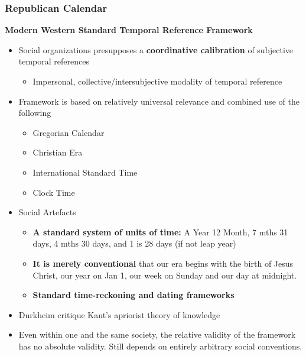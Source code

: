 \documentclass[a4paper]{article}
\begin{document}
\subsubsection{Republican Calendar}
\textbf{Modern Western Standard Temporal Reference Framework}
\begin{itemize}
	\item Social organizations presupposes a \textbf{coordinative calibration} of subjective temporal references 
	\begin{itemize}[label=$\circ$]
		\item Impersonal, collective/intersubjective modality of temporal reference
	\end{itemize}
	\item Framework is based on relatively universal relevance and combined use of the following
	\begin{itemize}[label=$\circ$]
		\item Gregorian Calendar
		\item Christian Era
		\item International Standard Time 
		\item Clock Time
	\end{itemize}
	\item Social Artefacts
	\begin{itemize}[label=$\circ$]
		\item \textbf{A standard system of units of time:} A Year 12 Month, 7 mths 31 days, 4 mths 30 days, and 1 is 28 days (if not leap year)
		\item \textbf{It is merely conventional} that our era begins with the birth of Jesus Christ, our year on Jan 1, our week on Sunday and our day at midnight.
		\item \textbf{Standard time-reckoning and dating frameworks}
	\end{itemize}
	\item Durkheim critique Kant's apriorist theory of knowledge
	\item Even within one and the same society, the relative validity of the framework has no absolute validity. Still depends on entirely arbitrary social conventions.
\end{itemize}

\medskip
\end{document}
